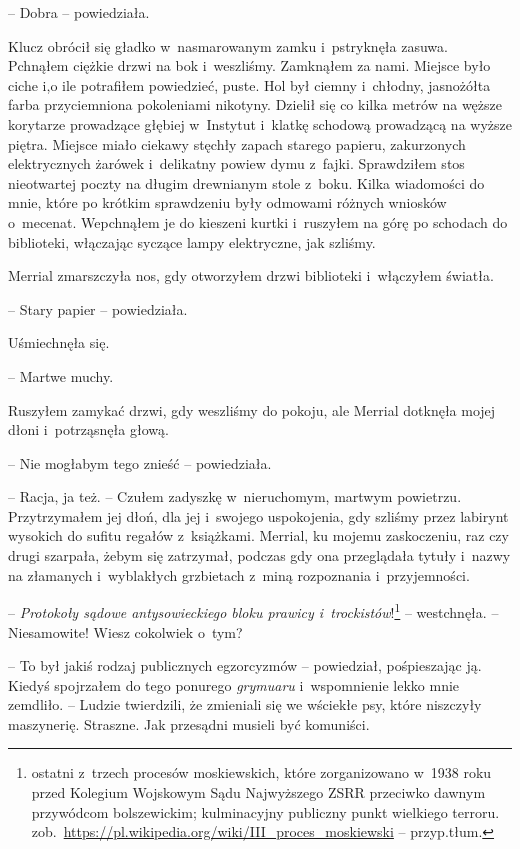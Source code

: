 \documentclass[oneside,polish,11pt,sfheadings]{mwbk}
\begin{document}
-- Dobra -- powiedziała.

Klucz obrócił się gładko w~nasmarowanym zamku i~pstryknęła zasuwa.
Pchnąłem ciężkie drzwi na bok i~weszliśmy. Zamknąłem za nami. Miejsce
było ciche i,o ile potrafiłem powiedzieć, puste. Hol był ciemny i~chłodny, jasnożółta farba przyciemniona pokoleniami nikotyny. Dzielił
się co kilka metrów na węższe korytarze prowadzące głębiej w~Instytut i~klatkę schodową prowadzącą na wyższe piętra. Miejsce miało ciekawy
stęchły zapach starego papieru, zakurzonych elektrycznych żarówek i~delikatny powiew dymu z~fajki. Sprawdziłem stos nieotwartej poczty na
długim drewnianym stole z~boku. Kilka wiadomości do mnie, które po
krótkim sprawdzeniu były odmowami różnych wniosków o~mecenat. Wepchnąłem
je do kieszeni kurtki i~ruszyłem na górę po schodach do biblioteki,
włączając syczące lampy elektryczne, jak szliśmy.

Merrial zmarszczyła nos, gdy otworzyłem drzwi biblioteki i~włączyłem
światła.

-- Stary papier -- powiedziała.

Uśmiechnęła się. 

-- Martwe muchy.

Ruszyłem zamykać drzwi, gdy weszliśmy do pokoju, ale Merrial dotknęła
mojej dłoni i~potrząsnęła głową.

-- Nie mogłabym tego znieść -- powiedziała.

-- Racja, ja też. -- Czułem zadyszkę w~nieruchomym, martwym powietrzu.
Przytrzymałem jej dłoń, dla jej i~swojego uspokojenia, gdy szliśmy przez
labirynt wysokich do sufitu regałów z~książkami. Merrial, ku mojemu
zaskoczeniu, raz czy drugi szarpała, żebym się zatrzymał, podczas gdy
ona przeglądała tytuły i~nazwy na złamanych i~wyblakłych grzbietach z~miną rozpoznania i~przyjemności.

-- \textit{Protokoły sądowe antysowieckiego bloku prawicy i~trockistów}!\footnote{ ostatni z~trzech procesów moskiewskich, które
zorganizowano w~1938 roku przed Kolegium Wojskowym Sądu Najwyższego ZSRR
przeciwko dawnym przywódcom bolszewickim; kulminacyjny publiczny punkt
wielkiego terroru.
zob.~\url{https://pl.wikipedia.org/wiki/III\_proces\_moskiewski}
-- przyp.tłum.} -- westchnęła. -- Niesamowite! Wiesz cokolwiek o~tym?

-- To był jakiś rodzaj publicznych egzorcyzmów -- powiedział, pośpieszając
ją. Kiedyś spojrzałem do tego ponurego \textit{grymuaru} i~wspomnienie
lekko mnie zemdliło. -- Ludzie twierdzili, że zmieniali się we wściekłe
psy, które niszczyły maszynerię. Straszne. Jak przesądni musieli być
komuniści.
\end{document}
